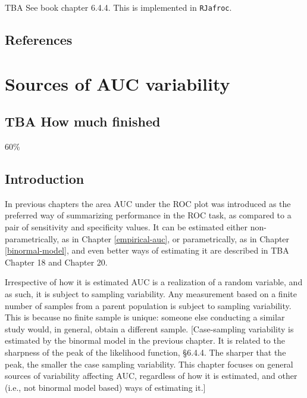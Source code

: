 \documentclass[
]{book}
\begin{document}
TBA See book chapter 6.4.4. This is implemented in \texttt{RJafroc}.

\hypertarget{binormal-model-references}{%
\section{References}\label{binormal-model-references}}

\hypertarget{sources-of-variability}{%
\chapter{Sources of AUC variability}\label{sources-of-variability}}

\hypertarget{sources-of-variability-how-much-finished}{%
\section{TBA How much finished}\label{sources-of-variability-how-much-finished}}

60\%

\hypertarget{sources-of-variabilityIntro}{%
\section{Introduction}\label{sources-of-variabilityIntro}}

In previous chapters the area AUC under the ROC plot was introduced as the preferred way of summarizing performance in the ROC task, as compared to a pair of sensitivity and specificity values. It can be estimated either non-parametrically, as in Chapter \ref{empirical-auc}, or parametrically, as in Chapter \ref{binormal-model}, and even better ways of estimating it are described in TBA Chapter 18 and Chapter 20.

Irrespective of how it is estimated AUC is a realization of a random variable, and as such, it is subject to sampling variability. Any measurement based on a finite number of samples from a parent population is subject to sampling variability. This is because no finite sample is unique: someone else conducting a similar study would, in general, obtain a different sample. {[}Case-sampling variability is estimated by the binormal model in the previous chapter. It is related to the sharpness of the peak of the likelihood function, §6.4.4. The sharper that the peak, the smaller the case sampling variability. This chapter focuses on general sources of variability affecting AUC, regardless of how it is estimated, and other (i.e., not binormal model based) ways of estimating it.{]}
\end{document}
